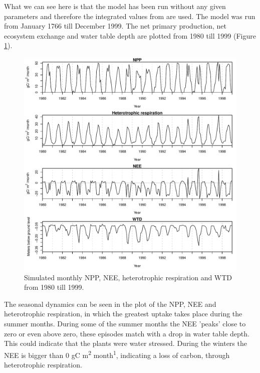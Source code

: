 \documentclass{article}\usepackage[]{graphicx}\usepackage[]{color}
\makeatletter
\def\maxwidth{ %
  \ifdim\Gin@nat@width>\linewidth
    \linewidth
  \else
    \Gin@nat@width
  \fi
}
\newenvironment{knitrout}{}{} %
\makeatother
\begin{document}
What we can see here is that the model has been run without any given parameters and therefore the integrated values from \cite{Heijmans2008a} are used. The model was run from January 1766 till December 1999. The net primary production, net ecosystem exchange and water table depth are plotted from 1980 till 1999 (Figure \ref{fig:plot_output}).

\begin{knitrout}
\color{fgcolor}\begin{figure}[H]

{\centering \includegraphics[width=\maxwidth]{figure/plot_output-1} 

}

\caption[Simulated monthly NPP, NEE, heterotrophic respiration and WTD from 1980 till 1999]{Simulated monthly NPP, NEE, heterotrophic respiration and WTD from 1980 till 1999.}\label{fig:plot_output}
\end{figure}


\end{knitrout}

The seasonal dynamics can be seen in the plot of the NPP, NEE and heterotrophic respiration, in which the greatest uptake takes place during the summer months. During some of the summer months the NEE 'peaks' close to zero or even above zero, these episodes match with a drop in water table depth. This could indicate that the plants were water stressed. During the winters the NEE is bigger than 0 gC m\textsuperscript{2} month\textsuperscript{1}, indicating a loss of carbon, through heterotrophic respiration.
\end{document}
